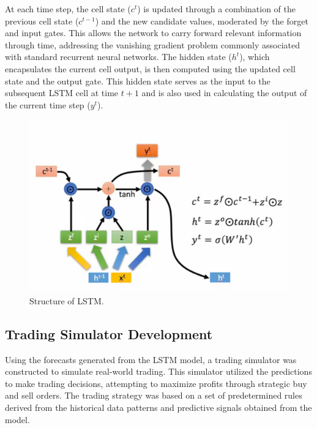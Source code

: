 \documentclass[conference]{IEEEtran}
\begin{document}
At each time step, the cell state (\( c^t \)) is updated through a combination of the previous cell state (\( c^{t-1} \)) and the new candidate values, moderated by the forget and input gates. This allows the network to carry forward relevant information through time, addressing the vanishing gradient problem commonly associated with standard recurrent neural networks. The hidden state (\( h^t \)), which encapsulates the current cell output, is then computed using the updated cell state and the output gate. This hidden state serves as the input to the subsequent LSTM cell at time \( t+1 \) and is also used in calculating the output of the current time step (\( y^t \)).


\begin{figure}[!ht]
\begin{center}
\includegraphics[width=\linewidth]{./img/lstm_structure.png} 
\caption{Structure of LSTM.}
\label{fig.1}
\end{center}
\end{figure}



\subsection{Trading Simulator Development}
Using the forecasts generated from the LSTM model, a trading simulator was constructed to simulate real-world trading. This simulator utilized the predictions to make trading decisions, attempting to maximize profits through strategic buy and sell orders. The trading strategy was based on a set of predetermined rules derived from the historical data patterns and predictive signals obtained from the model.
\end{document}
